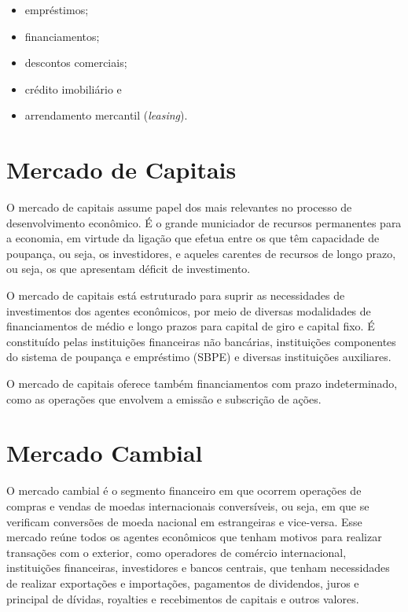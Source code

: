 \documentclass{article}\usepackage[]{graphicx}\usepackage[]{xcolor}
\begin{document}
\begin{itemize}

  \item empréstimos;
  
  \item financiamentos;
  
  \item descontos comerciais;
  
  \item crédito imobiliário e
  
  \item arrendamento mercantil (\textit{leasing}).
  
\end{itemize}

\section*{Mercado de Capitais}

O mercado de capitais assume papel dos mais relevantes no processo de desenvolvimento econômico. 
É o grande municiador de recursos permanentes para a economia, em virtude da ligação que efetua 
entre os que têm capacidade de poupança, ou seja, os investidores, e aqueles carentes de recursos 
de longo prazo, ou seja, os que apresentam déficit de investimento.\par

O mercado de capitais está estruturado para suprir as necessidades de investimentos dos agentes 
econômicos, por meio de diversas modalidades de financiamentos de médio e longo prazos para 
capital de giro e capital fixo. É constituído pelas instituições financeiras não bancárias, 
instituições componentes do sistema de poupança e empréstimo (SBPE) e diversas instituições auxiliares.\par

O mercado de capitais oferece também financiamentos com prazo indeterminado, como as operações 
que envolvem a emissão e subscrição de ações.\par

\section*{Mercado Cambial}

O mercado cambial é o segmento financeiro em que ocorrem operações de compras e vendas de moedas 
internacionais conversíveis, ou seja, em que se verificam conversões de moeda nacional em estrangeiras 
e vice-versa. Esse mercado reúne todos os agentes econômicos que tenham motivos para realizar 
transações com o exterior, como operadores de comércio internacional, instituições financeiras, 
investidores e bancos centrais, que tenham necessidades de realizar exportações e importações, 
pagamentos de dividendos, juros e principal de dívidas, royalties e recebimentos de capitais e outros valores.\par
\end{document}
